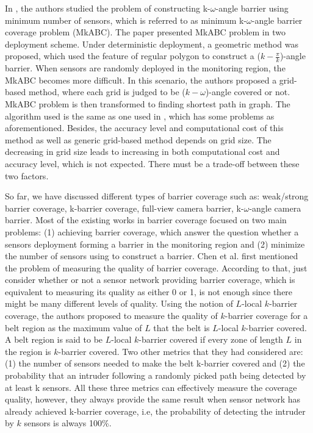 In \cite{xu2016minimum}, the authors studied the problem of constructing k-$\omega$-angle barrier using minimum number of sensors, which is referred to as minimum k-$\omega$-angle barrier coverage problem (MkABC). The paper presented MkABC problem in two deployment scheme. Under deterministic deployment, a geometric method was proposed, which used the feature of regular polygon to construct a ($k-\displaystyle\frac{\pi}{k}$)-angle barrier. When sensors are randomly deployed in the monitoring region, the MkABC becomes more difficult. In this scenario, the authors proposed a grid-based method, where each grid is judged to be ($k-\omega$)-angle covered or not. MkABC problem is then transformed to finding shortest path in graph. The algorithm used is the same as one used in \cite{ma2012minimum}, which has some problems as aforementioned. Besides, the accuracy level and computational cost of this method as well as generic grid-based method depends on grid size. The decreasing in grid size leads to increasing in both computational cost and accuracy level, which is not expected. There must be a trade-off between these two factors. \par

So far, we have discussed different types of barrier coverage such as: weak/strong barrier coverage, k-barrier coverage, full-view camera barrier, k-$\omega$-angle camera barrier. Most of the existing works in barrier coverage focused on two main problems: (1) achieving barrier coverage, which answer the question whether a sensors deployment forming a barrier in the monitoring region and (2) minimize the number of sensors using to construct a barrier. Chen et al. \cite{chen2008measuring} first mentioned the problem of measuring the quality of barrier coverage. According to that, just consider whether or not a sensor network providing barrier coverage, which is equivalent to measuring its quality as either 0 or 1, is not enough since there might be many different levels of quality. Using the notion of $L$-local $k$-barrier coverage, the authors proposed to measure the quality of $k$-barrier coverage for a belt region as the maximum value of $L$ that the belt is $L$-local $k$-barrier covered. A belt region is said to be $L$-local $k$-barrier covered if every zone of length $L$ in the region is $k$-barrier covered. Two other metrics that they had considered are: (1) the number of sensors needed to make the belt k-barrier covered and (2) the probability that an intruder following a randomly picked path being detected by at least k sensors. All these three metrics can effectively measure the coverage quality, however, they always provide the same result when sensor network has already achieved k-barrier coverage, i.e, the probability of detecting the intruder by $k$ sensors is always 100\%.\par

